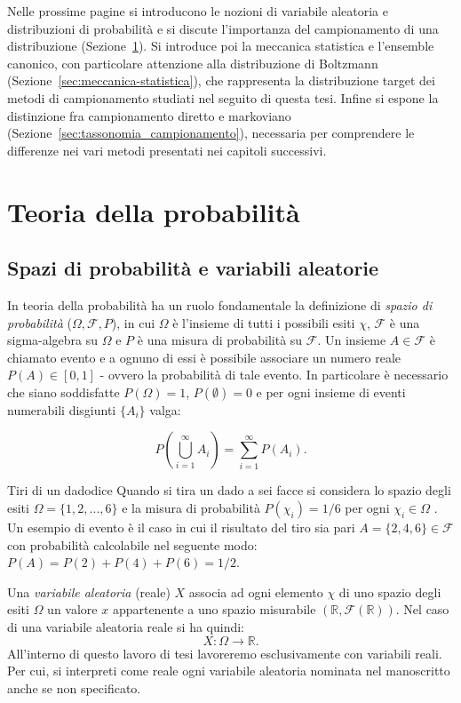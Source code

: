 Nelle prossime pagine si introducono le nozioni di variabile aleatoria e distribuzioni di probabilità e si discute l'importanza del campionamento di una distribuzione (Sezione~\ref{sec:probabilita}). Si introduce poi la meccanica statistica e l'ensemble canonico, con particolare attenzione alla distribuzione di Boltzmann (Sezione~\ref{sec:meccanica-statistica}), che rappresenta la distribuzione target dei metodi di campionamento studiati nel seguito di questa tesi. Infine si espone la distinzione fra campionamento diretto e markoviano (Sezione~\ref{sec:tassonomia_campionamento}), necessaria per comprendere le differenze nei vari metodi presentati nei capitoli successivi. 

\section{Teoria della probabilità}
\label{sec:probabilita}
\subsection{Spazi di probabilità e variabili aleatorie}
In teoria della probabilità ha un ruolo fondamentale la definizione di \emph{spazio di probabilità} ($ \Omega, \mathcal{F}, P$), in cui $\Omega$ è l'insieme di tutti i possibili esiti $\chi$, $\mathcal{F}$ è una sigma-algebra su $\Omega$ e $P$ è una misura di probabilità su $\mathcal{F}$. Un insieme $A \in \mathcal{F}$ è chiamato evento e a ognuno di essi è possibile associare un numero reale $P(A) \in [0, 1]$ - ovvero la probabilità di tale evento. In particolare è necessario che siano soddisfatte $P(\Omega) = 1$, $ P(\emptyset) = 0$ e per ogni insieme di eventi numerabili disgiunti $\{A_i\}$ valga:

\begin{equation}
    P\left(\bigcup_{i=1}^{\infty} A_i\right) = \sum_{i=1}^{\infty} P(A_i).
\end{equation}

\begin{example}{Tiri di un dado}{dice}
Quando si tira un dado a sei facce si considera lo spazio degli esiti $\Omega = \{1, 2, ... , 6\}$ e la misura di probabilità $P(\chi_i) = 1/6$ per ogni $\chi_i \in \Omega$ .
Un esempio di evento è il caso in cui il risultato del tiro sia pari $A =\{2, 4, 6\} \in  \mathcal{F}$ con probabilità calcolabile nel seguente modo: $P(A) = P(2) + P(4) + P(6) = 1/2$.
\end{example}

Una \emph{variabile aleatoria} (reale) $X$ associa ad ogni elemento $\chi$  di uno spazio degli esiti $\Omega$ un valore $x$ appartenente a uno spazio misurabile $(\mathbb{R}, \mathcal{F}(\mathbb{R}))$. Nel caso di una variabile aleatoria reale si ha quindi:
\begin{equation}
X:\Omega \rightarrow \mathbb{R}.
\end{equation} All'interno di questo lavoro di tesi lavoreremo esclusivamente con variabili reali. Per cui, si interpreti come reale ogni variabile aleatoria nominata nel manoscritto anche se non specificato.

